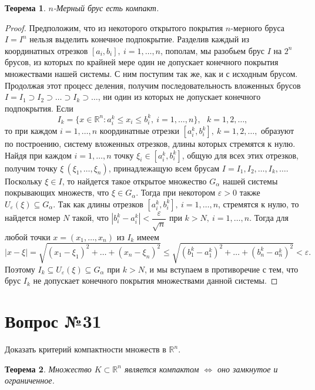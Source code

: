 \documentclass[12pt]{report}
\numberwithin{equation}{section}
\newtheorem{theorem}{Теорема}[section]
\begin{document}
\begin{theorem} \label{th:30:1}
$n$-Мерный брус есть компакт.
\end{theorem}
\begin{proof}
Предположим, что из некоторого открытого покрытия $n$-мерного бруса $I = I^n$ нельзя выделить конечное подпокрытие. Разделив каждый из координатных отрезков $[a_i, b_i],~i = 1, \ldots, n$, пополам, мы разобьем брус $I$ на $2^n$ брусов, из которых по крайней мере один не допускает конечного покрытия множествами нашей системы. С ним поступим так же, как и с исходным брусом. Продолжая этот процесс деления, получим последовательность вложенных брусов $I = I_1 \supset I_2 \supset \ldots \supset I_k \supset \ldots$, ни один из которых не допускает конечного подпокрытия. Если
\[ I_k = \{ x \in \mathbb{R}^n : a_i^k \leqslant x_i \leqslant b_i^k, ~i = 1, \ldots, n\},~~~k = 1, 2 , \ldots, \]
то при каждом $i = 1, \ldots, n$ координатные отрезки $[a_i^k, b_i^k],~k = 1,2,\ldots,$ образуют по построению, систему вложенных отрезков, длины которых стремятся к нулю. Найдя при каждом $i = 1, \ldots, n$ точку $\xi_i \in [a_i^k, b_i^k]$, общую для всех этих отрезков, получим точку $\xi \ (\xi_1, \ldots, \xi_n)$, принадлежащую всем брусам $I = I_1, I_2, \ldots, I_k, \ldots$. Поскольку $\xi \in I$, то найдется такое открытое множество $G_{\alpha}$ нашей системы покрывающих множеств, что $\xi \in G_{\alpha}$. Тогда при некотором $\varepsilon > 0$ также $U_{\varepsilon}(\xi) \subseteq G_{\alpha}$. Так как длины отрезков $[a_i^k, b_i^k],~i = 1, \ldots, n$, стремятся к нулю, то найдется номер $N$ такой, что $|b_i^k - a_i^k| < \dfrac{\varepsilon}{\sqrt{n}}$ при $k > N,~i = 1, \ldots, n$. Тогда для любой точки $x = (x_1, \ldots, x_n)$ из $I_k$ имеем
\[ |x - \xi| = \sqrt{(x_1 - \xi_1)^2 + \dots + (x_n - \xi_n)^2} \leqslant \sqrt{(b_1^k - a_1^k)^2 + \dots + (b_n^k - a_n^k)^2} < \varepsilon. \]
Поэтому $I_k \subseteq U_{\varepsilon}(\xi) \subseteq G_{\alpha}$ при $k > N$, и мы вступаем в противоречие с тем, что брус $I_k$ не допускает конечного покрытия множествами данной системы.
\end{proof}

\newpage \section{Вопрос №31} %
\begin{framed}
Доказать критерий компактности множеств в $\mathbb{R}^n$.
\end{framed}
\begin{theorem} \label{th:31:1}
Множество $K \subset \mathbb{R}^n$ является компактом $\iff$ оно замкнутое и ограниченное.
\end{theorem}
\end{document}
